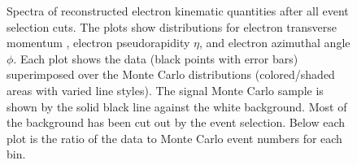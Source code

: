 \begin{figure}[htb]
\begin{center}
  \end{center}
   \caption[\fixspacing Reconstructed electron \pt, $\eta$, $\phi$ spectra after full selection]{
   \fixspacing Spectra of reconstructed electron kinematic quantities after all event selection cuts. 
   The plots show distributions for 
    electron transverse momentum \pt, 
    electron pseudorapidity $\eta$, and 
    electron azimuthal angle $\phi$. %
   Each plot shows the data (black points with error bars) superimposed over the Monte Carlo 
   distributions (colored/shaded areas with varied line styles).  
   The signal Monte Carlo sample is shown by the solid black line against the white background.  
   Most of the background has been cut out by the event selection.  
   Below each plot is the ratio of the data to Monte Carlo event numbers for each bin.  
  }
  \label{fig:RecoSpectraAfterEid}
 \end{figure}



